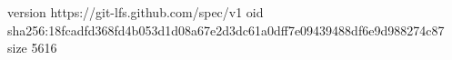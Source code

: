 version https://git-lfs.github.com/spec/v1
oid sha256:18fcadfd368fd4b053d1d08a67e2d3dc61a0dff7e09439488df6e9d988274c87
size 5616
